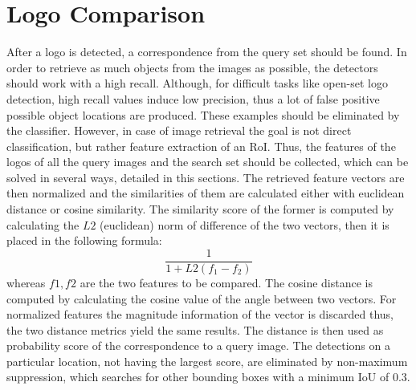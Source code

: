\section{Logo Comparison}\label{s:logocomparison}
After a logo is detected, a correspondence from the query set should be found. In order to retrieve as much objects from the images as possible, the detectors should work with a high recall. Although, for difficult tasks like open-set logo detection, high recall values induce low precision, thus a lot of false positive possible object locations are produced. These examples should be eliminated by the classifier.
\bigbreak
However, in case of image retrieval the goal is not direct classification, but rather feature extraction of an RoI. Thus, the features of the logos of all the query images and the search set should be collected, which can be solved in several ways, detailed in this sections. The retrieved feature vectors are then normalized and the similarities of them are calculated either with euclidean distance or cosine similarity. The similarity score of the former is computed by calculating the $L2$ (euclidean) norm of difference of the two vectors, then it is placed in the following formula:
\begin{equation}
        \frac{1}{1 + L2(f_1 - f_2)}
        \label{eq:iou}
\end{equation}
whereas $f1, f2$ are the two features to be compared. The cosine distance is computed by calculating the cosine value of the angle between two vectors. For normalized features the magnitude information of the vector is discarded thus, the two distance metrics yield the same results. The distance is then used as probability score of the correspondence to a query image. The detections on a particular location, not having the largest score, are eliminated by non-maximum suppression, which searches for other bounding boxes with a minimum IoU of 0.3.
\bigbreak
